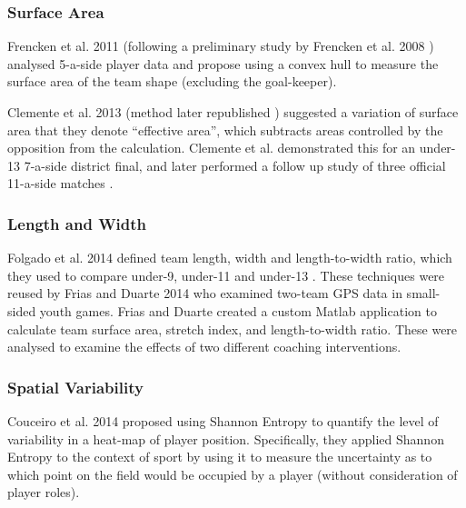 
\subsubsection{Surface Area}

Frencken et al. 2011 \cite{Frencken2011} (following a preliminary study by Frencken et al. 2008 \cite{Frencken2008}) analysed 5-a-side \soccer{} player data and propose using a convex hull to measure the surface area of the team shape (excluding the goal-keeper). %

Clemente et al. 2013 \cite{Clemente2013a} (method later republished \cite{Clemente2013c}) suggested a variation of surface area that they denote ``effective area'', which subtracts areas controlled by the opposition from the calculation. Clemente et al. demonstrated this for an under-13 7-a-side \soccer{} district final, and later performed a follow up study of three official 11-a-side \soccer{} matches \cite{Clemente2013b}.

\subsubsection{Length and Width}

Folgado et al. 2014 \cite{Folgado2014} defined team length, width and length-to-width ratio, which they used to compare under-9, under-11 and under-13 \soccer{}. These techniques were reused by Frias and Duarte 2014 \cite{Frias2014} who examined two-team GPS data in small-sided youth \soccer{} games. Frias and Duarte created a custom Matlab application to calculate team surface area, stretch index, and length-to-width ratio. These were analysed to examine the effects of two different coaching interventions.


\subsubsection{Spatial Variability}

Couceiro et al. 2014 \cite{Couceiro2014} proposed using Shannon Entropy \cite{Shannon1948} to quantify the level of variability in a heat-map of player position. Specifically, they applied Shannon Entropy to the context of sport by using it to measure the uncertainty as to which point on the field would be occupied by a player (without consideration of player roles).

\closechapterblock
